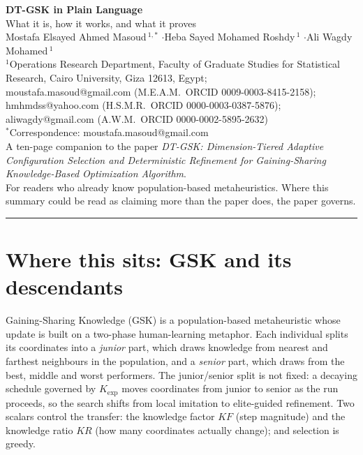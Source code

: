 \documentclass[11pt,a4paper]{article}
\begin{document}
\begin{center}
{\LARGE\bfseries DT-GSK in Plain Language}\\[3pt]
{\large What it is, how it works, and what it proves}\\[7pt]
{\small Mostafa Elsayed Ahmed Masoud\,$^{1,*}$ \quad$\cdot$\quad Heba Sayed Mohamed Roshdy\,$^{1}$ \quad$\cdot$\quad Ali Wagdy Mohamed\,$^{1}$}\\[2pt]
{\footnotesize $^{1}$\;Operations Research Department, Faculty of Graduate Studies for Statistical
Research, Cairo University, Giza 12613, Egypt;\\
moustafa.masoud@gmail.com (M.E.A.M.\ ORCID 0009-0003-8415-2158);
hmhmdss@yahoo.com (H.S.M.R.\ ORCID 0000-0003-0387-5876);
aliwagdy@gmail.com (A.W.M.\ ORCID 0000-0002-5895-2632)}\\[1pt]
{\footnotesize $^{*}$\;Correspondence: moustafa.masoud@gmail.com}\\[5pt]
{\footnotesize A ten-page companion to the paper \emph{DT-GSK: Dimension-Tiered Adaptive Configuration
Selection and Deterministic Refinement for Gaining-Sharing Knowledge-Based
Optimization Algorithm}.\\
For readers who already know population-based metaheuristics. Where this
summary could be read as claiming more than the paper does, the paper governs.}
\end{center}

\vspace{2pt}\hrule\vspace{6pt}

\section{Where this sits: GSK and its descendants}

Gaining-Sharing Knowledge (GSK) is a population-based metaheuristic whose
update is built on a two-phase human-learning metaphor. Each individual splits
its coordinates into a \emph{junior} part, which draws knowledge from nearest
and farthest neighbours in the population, and a \emph{senior} part, which
draws from the best, middle and worst performers. The junior/senior split is not
fixed: a decaying schedule governed by $K_{\exp}$ moves coordinates from junior
to senior as the run proceeds, so the search shifts from local imitation to
elite-guided refinement. Two scalars control the transfer: the knowledge
factor $KF$ (step magnitude) and the knowledge ratio $KR$ (how many coordinates
actually change); and selection is greedy.
\end{document}
